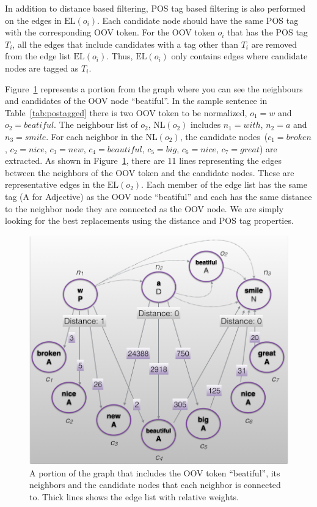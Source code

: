 \documentclass[a4paper,onesided,12pt]{report}
\begin{document}
In addition to distance based filtering, POS tag based filtering is also performed on the edges in $\text{EL}(o_i)$. Each candidate node should have the same POS tag with the corresponding OOV token. For the OOV token $o_i$ that has the POS tag $T_i$, all the edges that include candidates with a tag other than $T_i$ are removed from the edge list $\text{EL}(o_{i})$. Thus, $\text{EL}(o_{i})$ only contains edges where candidate nodes are tagged as $T_i$.

Figure~\ref{fig:edgeWeight} represents a portion from the graph where you can see the neighbours  and candidates of the OOV node ``beatiful''. In the sample sentence in Table~\ref{tab:postagged} there is two OOV token to be normalized, $o_1=w$ and $o_2=beatiful$. The neighbour list of $o_2$, $\text{NL}(o_2)$ includes  $n_1=with$, $n_2=a$ and $n_3=smile$. For each neighbor in the $\text{NL}(o_2)$, the candidate nodes~($c_1=broken$, $c_2=nice$, $c_3=new$, $c_4=beautiful$, $c_5=big$, $c_6=nice$, $c_7=great$) are extracted. As shown in Figure~\ref{fig:edgeWeight}, there are 11 lines representing the edges between the neighbors of the OOV token and the candidate nodes. These are representative edges in the $\text{EL}(o_2)$. Each member of the edge list has the same tag (A for Adjective) as the OOV node ``beatiful'' and each has the same distance to the neighbor node they are connected as the OOV node. We are simply looking for the best replacements using the distance and POS tag properties.

\begin{figure}[htb]
\begin{center}
\includegraphics[scale=0.5]{fig/edgeWeight}
\caption{A portion of the graph that includes the OOV token ``beatiful'', its neighbors and the candidate nodes that each neighbor is connected to. Thick lines shows the edge list with relative weights.}
\label{fig:edgeWeight}
\end{center}
\end{figure}
\end{document}
